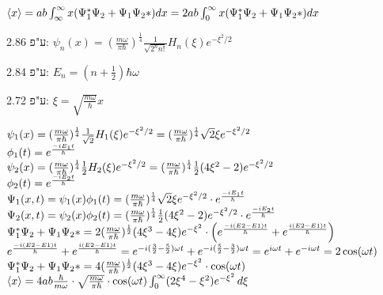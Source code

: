\documentclass[14pt]{extarticle}
\makeatletter
\newenvironment{lefteqs}{%
    \begin{english}%
    \begin{flushleft}%
    \renewcommand{\arraystretch}{1.3}%
    $\begin{array}{@{}l@{}}%
}{%
    \end{array}$%
    \end{flushleft}%
    \end{english}%
}
\makeatother
\begin{document}
\begin{lefteqs}
    \langle x \rangle = ab \int_{\infty}^{\infty} x (\Psi_1 ^{*} \Psi_2 + \Psi_1 \Psi_2{*}) dx = 2ab \int_{0}^{\infty} x (\Psi_1 ^{*} \Psi_2 + \Psi_1 \Psi_2{*}) dx \\
\end{lefteqs}
ע"פ 2.86: $\psi_n(x) = (\frac{m\omega}{\pi \hbar})^{\frac{1}{4}} \frac{1}{\sqrt{2^n n!}} H_n(\xi) e^{-\xi^2/2}$

ע"פ 2.84: $E_n = (n+\frac{1}{2})\hbar \omega$

ע"פ 2.72: $\xi = \sqrt{\frac{m\omega}{\hbar}} x$

\begin{lefteqs}
    \psi_1(x) = (\frac{m\omega}{\pi \hbar})^{\frac{1}{4}} \frac{1}{\sqrt{2}} H_1(\xi) e^{-\xi^2/2} = (\frac{m\omega}{\pi \hbar})^{\frac{1}{4}} \sqrt{2} \xi e^{-\xi^2/2} \\
    \phi_1(t) = e^{\frac{-iE_1 t}{\hbar}} \\
    \psi_2(x) = (\frac{m\omega}{\pi \hbar})^{\frac{1}{4}} \frac{1}{2} H_2(\xi) e^{-\xi^2/2} = (\frac{m\omega}{\pi \hbar})^{\frac{1}{4}} \frac{1}{2} (4\xi^2 - 2) e^{-\xi^2/2} \\
    \phi_2(t) = e^{\frac{-iE_2 t}{\hbar}} \\
    \Psi_1(x,t) = \psi_1(x) \phi_1(t) = (\frac{m\omega}{\pi \hbar})^{\frac{1}{4}} \sqrt{2} \xi e^{-\xi^2/2} \cdot e^{\frac{-iE_1 t}{\hbar}} \\
    \Psi_2(x,t) = \psi_2(x) \phi_2(t) = (\frac{m\omega}{\pi \hbar})^{\frac{1}{4}} \frac{1}{2} (4\xi^2 - 2) e^{-\xi^2/2} \cdot e^{\frac{-iE_2 t}{\hbar}} \\
    \Psi_1^{*} \Psi_2 + \Psi_1 \Psi_2{*} = 2 (\frac{m\omega}{\pi \hbar})^{\frac{1}{2}} (4\xi^3 - 4\xi) e^{-\xi^2} \cdot \left( e^{\frac{-i(E2-E1)t}{\hbar}} + e^{\frac{i(E2-E1)t}{\hbar}} \right) \\
    e^{\frac{-i(E2-E1)t}{\hbar}} + e^{\frac{i(E2-E1)t}{\hbar}} = e^{-i(\frac{3}{2} - \frac{5}{2})\omega t} + e^{-i(\frac{5}{2}-\frac{3}{2})\omega t} = e^{i\omega t} + e^{-i\omega t} = 2\cos(\omega t) \\
    \Psi_1^{*} \Psi_2 + \Psi_1 \Psi_2{*} = 4 (\frac{m\omega}{\pi \hbar})^{\frac{1}{2}} (4\xi^3 - 4\xi) e^{-\xi^2} \cdot \cos(\omega t) \\
    \langle x \rangle = 4ab \frac{\hbar}{m\omega} \cdot \sqrt{\frac{m\omega}{\pi \hbar}} \cdot \cos(\omega t) \int_{0}^{\infty} (2\xi^4 - \xi^2) e^{-\xi^2} \, d\xi
\end{lefteqs}
\end{document}
